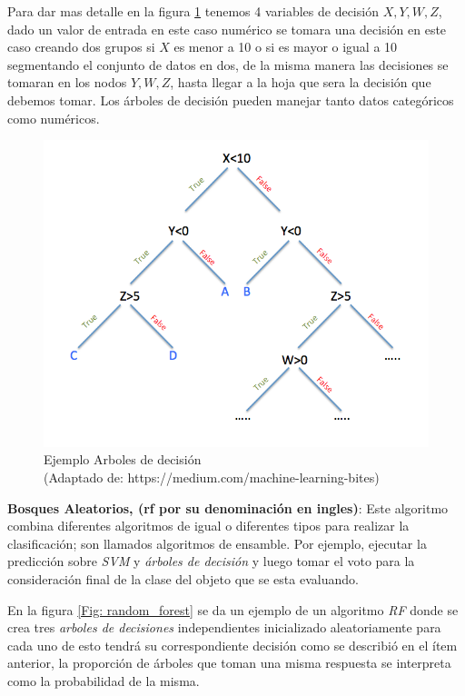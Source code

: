 Para dar mas detalle en la figura \ref{Fig: decision-tree} tenemos 4 variables de decisión $ X, Y, W, Z$, dado un valor  de entrada en este caso numérico se tomara una decisión en este caso creando dos grupos  si $ X$  es menor a 10 o si es mayor o igual a 10 segmentando el conjunto de datos en dos, de la misma manera las decisiones se tomaran en los nodos $ Y, W, Z$, hasta llegar a la hoja que sera la decisión que debemos tomar. Los árboles de decisión pueden manejar tanto datos categóricos como numéricos.

  
\begin{figure}[H]
 \centering
  \includegraphics[scale=0.3,keepaspectratio=true,clip=true]{imagenes/MarcoTeorico/decision-tree.png}
  \caption{Ejemplo Arboles de decisión \\ (Adaptado de: https://medium.com/machine-learning-bites)}
  \label{Fig: decision-tree}
\end{figure}


\par \textbf{Bosques Aleatorios, (\ac{rf} por su denominación en ingles)}: Este  algoritmo combina diferentes algoritmos de igual o diferentes tipos para realizar la clasificación; son llamados algoritmos de ensamble. Por ejemplo, ejecutar la predicción sobre \textit{SVM} y \textit{árboles de decisión} y luego tomar el voto para la consideración final de la clase del objeto que se esta evaluando.  

En la figura \ref{Fig: random_forest} se da un ejemplo de un algoritmo \textit{RF} donde se crea tres \textit{arboles de decisiones} independientes  inicializado aleatoriamente para cada uno de esto tendrá su correspondiente decisión como se describió en el ítem anterior, la proporción de árboles que toman una misma respuesta se interpreta como la probabilidad de la misma.

